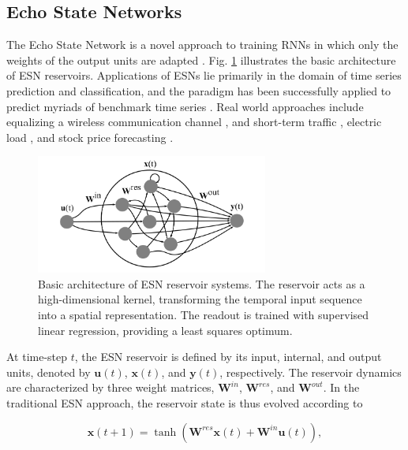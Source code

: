 \subsection{Echo State Networks}

The Echo State Network is a novel approach to training RNNs in which only the
weights of the output units are adapted \cite{jaeger_echo_2001}. Fig. \ref{esn}
illustrates the basic architecture of ESN reservoirs. Applications of ESNs lie
primarily in the domain of time series prediction and classification, and the
paradigm has been successfully applied to predict myriads of benchmark time
series \cite{goudarzi_comparative_2014, alippi_quantification_2009,
rodan_minimum_2011}. Real world approaches include equalizing a wireless
communication channel \cite{jaeger_harnessing_2004}, and short-term traffic
\cite{an_short-term_2011}, electric load \cite{song_hourly_2011}, and stock
price forecasting \cite{lin_short-term_2009}.

\begin{figure}[t!]
  \centering
  \includegraphics[width=3.0in]{img/esn.png}
  \caption{
    Basic architecture of ESN reservoir systems. The reservoir acts as a
high-dimensional kernel, transforming the temporal input sequence into a spatial
representation. The readout is trained with supervised linear regression,
providing a least squares optimum.
  }
  \label{esn}
\end{figure}

At time-step $t$, the ESN reservoir is defined by its input, internal, and
output units, denoted by $\mathbf{u}(t)$, $\mathbf{x}(t)$, and $\mathbf{y}(t)$,
respectively. The reservoir dynamics are characterized by three weight matrices,
$\mathbf{W}^{in}$, $\mathbf{W}^{res}$, and $\mathbf{W}^{out}$. In the
traditional ESN approach, the reservoir state is thus evolved according to

\begin{equation}
  \mathbf{x}(t + 1) =
    \tanh(\mathbf{W}^{res}\mathbf{x}(t)
        + \mathbf{W}^{in}\mathbf{u}(t)),
  \label{xt}
\end{equation}

